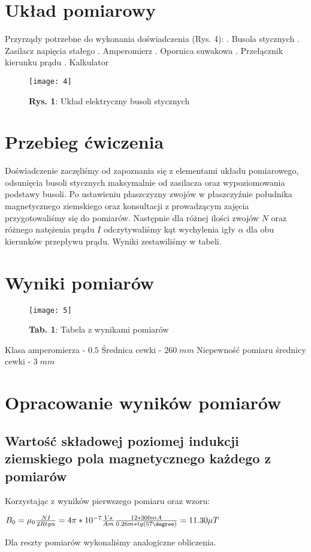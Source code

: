 \documentclass[12pt]{article}
\begin{document}
\section{Układ pomiarowy}
Przyrządy potrzebne do wykonania doświadczenia (Rys. 4): . Busola stycznych . Zasilacz napięcia stałego . Amperomierz . Opornica suwakowa . Przełącznik kierunku prądu . Kalkulator \newline
\begin{figure}[H]
\centering
\texttt{[image: 4]}
\caption*{\textbf{Rys. 1}: Układ elektryczny busoli stycznych}
\end{figure} \newpage
\section{Przebieg ćwiczenia}
Doświadczenie zaczęliśmy od zapoznania się z elementami układu pomiarowego, odsunięcia busoli stycznych maksymalnie od zasilacza oraz wypoziomowania 
podstawy busoli. Po ustawieniu płaszczyzny zwojów w płaszczyźnie południka magnetycznego ziemskiego oraz konsultacji z prowadzącym zajęcia przygotowaliśmy się do pomiarów. Następnie dla różnej ilości zwojów $N$ oraz różnego natężenia prądu $I$ odczytywaliśmy kąt wychylenia igły $\alpha$ dla obu kierunków przepływu prądu. Wyniki zestawiliśmy w tabeli.
\section{Wyniki pomiarów}
\begin{figure}[H]
\centering
\texttt{[image: 5]}
\caption*{\textbf{Tab. 1}: Tabela z wynikami pomiarów}
\end{figure} 

Klasa amperomierza - $0.5$ \newline
Średnica cewki - $260\;mm$ \newline
Niepewność pomiaru średnicy cewki - $3\;mm$
\section{Opracowanie wyników pomiarów}
\subsection{Wartość składowej poziomej indukcji ziemskiego pola magnetycznego każdego z pomiarów}
Korzystając z wyników pierwszego pomiaru oraz wzoru:
\begin{center}
\Large $B_0=\mu_0\frac{NI}{2Rtg\alpha} = 4\pi*10^{-7}\frac{Vs}{Am}\frac{12*300mA}{0.26m*tg(57\degree)} = 11.30\mu{T}$
\end{center}
Dla reszty pomiarów wykonaliśmy analogiczne obliczenia.
\end{document}
